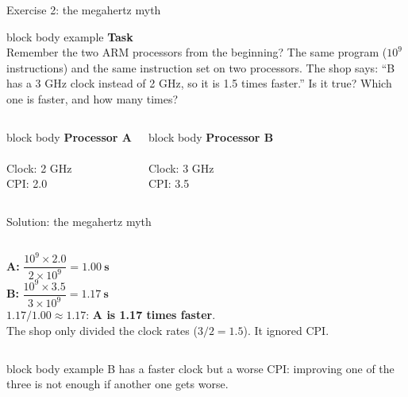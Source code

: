 \documentclass[aspectratio=169,10pt]{beamer}
\newcommand{\taskhead}[2]{%
  \begin{beamercolorbox}[rounded=true,sep=0.12cm,wd=\linewidth]{block body example}
    \small\textbf{#1}\\[0.04cm]
    \footnotesize #2
  \end{beamercolorbox}\vspace{0.1cm}}
\newcommand{\keymsg}[1]{%
  \begin{beamercolorbox}[rounded=true,sep=0.1cm,wd=\textwidth]{block body example}
    \centering\footnotesize #1
  \end{beamercolorbox}}
\begin{document}
\begin{frame}{Exercise 2: the megahertz myth}
  \taskhead{Task}{Remember the two ARM processors from the beginning? The same program ($10^9$ instructions)
    and the same instruction set on two processors. The shop says: ``B has a 3 GHz clock instead of 2 GHz, so it is 1.5 times faster.''
    Is it true? Which one is faster, and how many times?}
  \vspace{0.2cm}
  \begin{columns}[T,onlytextwidth]
      \begin{beamercolorbox}[rounded=true,sep=0.16cm,wd=\linewidth]{block body}
        \centering\large\textbf{Processor A}\\[0.15cm]
        {\Huge\textcolor{DeepBlue}{\faMicrochip}}\\[0.15cm]
        \normalsize Clock: 2 GHz\\ CPI: 2.0
      \end{beamercolorbox}
      \begin{beamercolorbox}[rounded=true,sep=0.16cm,wd=\linewidth]{block body}
        \centering\large\textbf{Processor B}\\[0.15cm]
        {\Huge\textcolor{DeepBlue}{\faMicrochip}}\\[0.15cm]
        \normalsize Clock: 3 GHz\\ CPI: 3.5
      \end{beamercolorbox}
  \end{columns}
\end{frame}

\begin{frame}{Solution: the megahertz myth}
  \begin{columns}[c,onlytextwidth]
      \small
      \textbf{A:} $\dfrac{10^9 \times 2.0}{2 \times 10^9} = \mathbf{1.00\ s}$\\[0.3cm]
      \textbf{B:} $\dfrac{10^9 \times 3.5}{3 \times 10^9} = \mathbf{1.17\ s}$\\[0.3cm]
      $1.17 / 1.00 \approx 1.17$: \textbf{A is 1.17 times faster}.\\[0.3cm]
      The shop only divided the clock rates ($3 / 2 = 1.5$). It ignored CPI.
      \centering
  \end{columns}
  \vfill
  \keymsg{B has a faster clock but a worse CPI: improving one of the three is not enough if another one gets worse.}
\end{frame}
\end{document}
